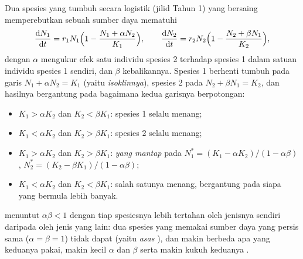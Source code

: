 \begin{theorem}\label{thm:b2:speciation:lv}
Dua spesies yang tumbuh secara logistik (jilid Tahun 1) yang bersaing
memperebutkan sebuah sumber daya mematuhi
\[
\frac{\mathrm{d}N_1}{\mathrm{d}t} = r_1 N_1\Bigl(1 - \frac{N_1 + \alpha N_2}{K_1}\Bigr), \qquad
\frac{\mathrm{d}N_2}{\mathrm{d}t} = r_2 N_2\Bigl(1 - \frac{N_2 + \beta N_1}{K_2}\Bigr),
\]
dengan $\alpha$ mengukur efek satu individu spesies 2 terhadap spesies
1 dalam satuan individu spesies 1 sendiri, dan $\beta$ kebalikannya.
Spesies 1 berhenti tumbuh pada garis $N_1 + \alpha N_2 =
K_1$ (yaitu
\emph{isoklinnya}), spesies 2 pada $N_2 + \beta N_1 = K_2$, dan hasilnya
bergantung pada bagaimana kedua garisnya berpotongan:
\begin{itemize}
  \item $K_1 > \alpha K_2$ dan $K_2 < \beta K_1$: spesies 1 selalu
        menang;
  \item $K_1 < \alpha K_2$ dan $K_2 > \beta K_1$: spesies 2 selalu
        menang;
  \item $K_1 > \alpha K_2$ dan $K_2 > \beta K_1$: \emph{ yang mantap} pada $N_1^{*} = (K_1 - \alpha K_2)/(1 - \alpha\beta)$,
        $N_2^{*} = (K_2 - \beta K_1)/(1 - \alpha\beta)$;
  \item $K_1 < \alpha K_2$ dan $K_2 < \beta K_1$: salah satunya
        menang, bergantung pada siapa yang bermula lebih banyak.
\end{itemize}
 menuntut $\alpha\beta < 1$ dengan tiap spesiesnya
lebih tertahan oleh jenisnya sendiri daripada oleh jenis yang lain: dua
spesies yang memakai sumber daya yang persis sama ($\alpha = \beta = 1$) tidak dapat  (yaitu \emph{asas }), dan makin berbeda apa yang keduanya pakai, makin kecil
$\alpha$ dan $\beta$ serta makin kukuh keduanya .
\end{theorem}
